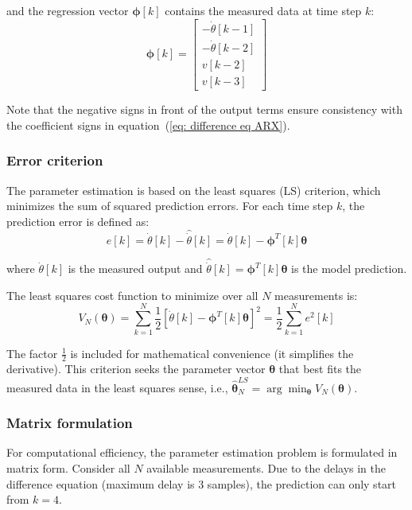 \documentclass{article}
\begin{document}
	and the regression vector $\boldsymbol{\phi}[k]$ contains the measured data at time step $k$:
	\begin{equation}
		\boldsymbol{\phi}[k] = \begin{bmatrix} -\dot{\theta}[k-1] \\ -\dot{\theta}[k-2] \\ v[k-2] \\ v[k-3] \end{bmatrix}
	\end{equation}
	
	Note that the negative signs in front of the output terms ensure consistency with the coefficient signs in equation~(\ref{eq: difference eq ARX}).
	
	\subsubsection*{Error criterion}
	
	The parameter estimation is based on the least squares (LS) criterion, which minimizes the sum of squared prediction errors. For each time step $k$, the prediction error is defined as:
	\[
	e[k] = \dot{\theta}[k] - \hat{\dot{\theta}}[k] = \dot{\theta}[k] - \boldsymbol{\phi}^T[k] \boldsymbol{\theta}
	\]
	
	where $\dot{\theta}[k]$ is the measured output and $\hat{\dot{\theta}}[k] = \boldsymbol{\phi}^T[k] \boldsymbol{\theta}$ is the model prediction.
	
	The least squares cost function to minimize over all $N$ measurements is:
	\begin{equation}
		V_N(\boldsymbol{\theta}) = \sum ^N _{k=1}  \frac{1}{2} [\dot{\theta}[k] - \boldsymbol{\phi}^T[k] \boldsymbol{\theta}]^2 = \frac{1}{2} \sum ^N _{k=1} e^2[k]
		\label{eq: LS criterion}
	\end{equation}
	
	The factor $\frac{1}{2}$ is included for mathematical convenience (it simplifies the derivative). This criterion seeks the parameter vector $\boldsymbol{\theta}$ that best fits the measured data in the least squares sense, i.e., $\hat{\boldsymbol{\theta}}^{LS}_N = \arg\min_{\boldsymbol{\theta}} V_N(\boldsymbol{\theta})$.
	
	\subsubsection*{Matrix formulation}
	
	For computational efficiency, the parameter estimation problem is formulated in matrix form. Consider all $N$ available measurements. Due to the delays in the difference equation (maximum delay is 3 samples), the prediction can only start from $k = 4$. 
	
\end{document}
